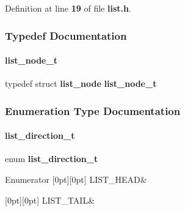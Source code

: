 Definition at line \textbf{ 19} of file \textbf{ list.\+h}.



\subsubsection{Typedef Documentation}
\mbox{\label{a00029_ad8b8636e2e25308b521b32071e849c80}} 
\paragraph{list\+\_\+node\+\_\+t}
{\footnotesize\ttfamily typedef struct \textbf{ list\+\_\+node}  \textbf{ list\+\_\+node\+\_\+t}}



\subsubsection{Enumeration Type Documentation}
\mbox{\label{a00029_a2c3af7de0b7ab9c3a84fbc039e75ec66}} 
\paragraph{list\+\_\+direction\+\_\+t}
{\footnotesize\ttfamily enum \textbf{ list\+\_\+direction\+\_\+t}}

\begin{DoxyEnumFields}{Enumerator}
[0pt][0pt]{}\mbox{\label{a00029_a2c3af7de0b7ab9c3a84fbc039e75ec66abdf0fd732c6a91b57c5cbea177f1ae00}} 
L\+I\+S\+T\+\_\+\+H\+E\+AD&\\
\hline

[0pt][0pt]{}\mbox{\label{a00029_a2c3af7de0b7ab9c3a84fbc039e75ec66a92ccc72d8839c5167e82e2a7771215ae}} 
L\+I\+S\+T\+\_\+\+T\+A\+IL&\\
\hline

\end{DoxyEnumFields}


